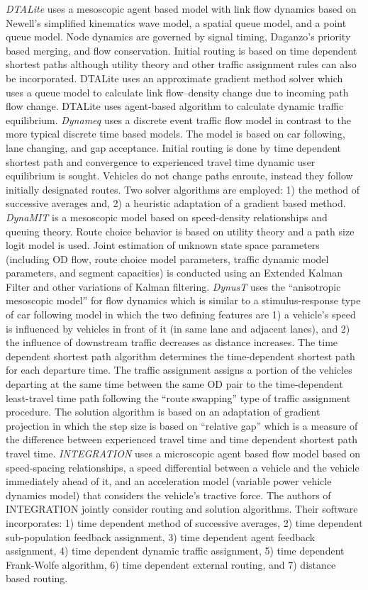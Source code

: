  \textit{DTALite} \cite{zhou2014dtalite} uses a mesoscopic agent based model with link flow dynamics based on Newell’s simplified kinematics wave model, a spatial queue model, and a point queue model. Node dynamics are governed by signal timing, Daganzo’s priority based merging, and flow conservation. Initial routing is based on time dependent shortest paths although utility theory and other traffic assignment rules can also be incorporated. DTALite uses an approximate gradient method solver which uses a queue model to calculate link flow–density change due to incoming path flow change. DTALite uses agent-based algorithm to calculate dynamic traffic equilibrium. \textit{Dynameq} uses a discrete event traffic flow model in contrast to the more typical discrete time based models. The model is based on car following, lane changing, and gap acceptance. Initial routing is done by time dependent shortest path and convergence to experienced travel time dynamic user equilibrium is sought. Vehicles do not change paths enroute, instead they follow initially designated routes. Two solver algorithms are employed: 1) the method of successive averages and, 2) a heuristic adaptation of a gradient based method. \textit{DynaMIT} \cite{DynaMIT,ben2001dynamit} is a mesoscopic model based on speed-density relationships and queuing theory. Route choice behavior is based on utility theory and a path size logit model is used. Joint estimation of unknown state space parameters (including OD flow, route choice model parameters, traffic dynamic model parameters, and segment capacities) is conducted using an Extended Kalman Filter and other variations of Kalman filtering.  
\textit{DynusT} \cite{chiu2011dynust} uses the “anisotropic mesoscopic model” for flow dynamics which is similar to a stimulus-response type of car following model in which the two defining features are 1) a vehicle’s speed is influenced by vehicles in front of it (in same lane and adjacent lanes), and 2) the influence of downstream traffic decreases as distance increases. The time dependent shortest path algorithm determines the time-dependent shortest path for each departure time. The traffic assignment assigns a portion of the vehicles departing at the same time between the same OD pair to the time-dependent least-travel time path following the “route swapping” type of traffic assignment procedure. The solution algorithm is based on an adaptation of gradient projection in which the step size is based on “relative gap” which is a measure of the difference between experienced travel time and time dependent shortest path travel time. \textit{INTEGRATION} \cite{rakha2012integration} uses a microscopic agent based flow model based on speed-spacing relationships, a speed differential between a vehicle and the vehicle immediately ahead of it, and an acceleration model (variable power vehicle dynamics model) that considers the vehicle’s tractive force. The authors of INTEGRATION jointly consider routing and solution algorithms. Their software incorporates: 1) time dependent method of successive averages, 2) time dependent sub-population feedback assignment, 3) time dependent agent feedback assignment, 4) time dependent dynamic traffic assignment, 5) time dependent Frank-Wolfe algorithm, 6) time dependent external routing, and 7) distance based routing. 